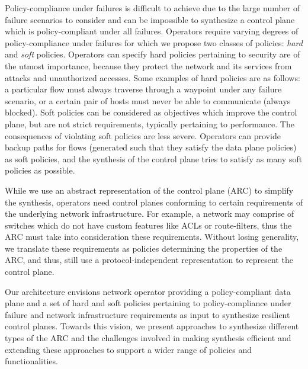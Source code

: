 Policy-compliance under failures is difficult to achieve due 
to the large number of failure scenarios to consider and can 
be impossible to synthesize a control plane which is 
policy-compliant under all failures. Operators require 
varying degrees of policy-compliance under failures for 
which we propose two classes of policies: {\em hard} and
{\em soft} policies. Operators can specify 
hard policies pertaining
to security are of the utmost importance, 
because they protect the network and
its services from attacks and unauthorized accesses. Some 
examples of hard policies are as follows: 
a particular flow must always traverse through a waypoint 
under any failure scenario, or a certain pair of hosts must 
never be able to communicate (always blocked). 
Soft policies can be considered as objectives which improve 
the control plane, but are not strict requirements, typically
pertaining to performance. The consequences of violating
soft policies are less severe. Operators can provide 
backup paths for flows (generated such that they 
satisfy the data plane policies) as soft policies, 
and the synthesis of the control plane 
tries to satisfy as many soft policies as 
possible. 

While we use an abstract representation of the control
plane (ARC) to simplify the synthesis, operators need control 
planes conforming to certain requirements of the 
underlying network infrastructure. For example, a 
network may comprise of switches which do not have custom
features like ACLs or route-filters, thus the ARC must take 
into consideration these requirements. Without losing 
generality, we translate these 
requirements as policies determining the properties of the
ARC, and thus, still use a protocol-independent representation
to represent the control plane. 

Our architecture envisions network operator providing
a policy-compliant data plane and a set of hard and soft policies
pertaining to policy-compliance under failure and network 
infrastructure requirements as input to synthesize resilient 
control planes. Towards this vision, we present  
approaches to synthesize different types of the ARC and the 
challenges involved in making synthesis efficient and
extending these approaches to support a wider range of 
policies and functionalities. 

